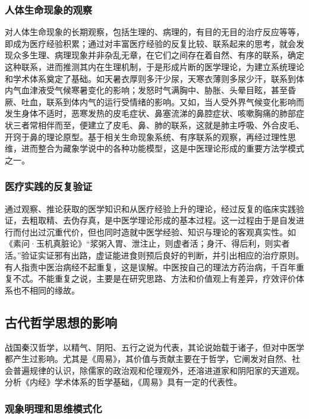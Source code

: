 \documentclass[draft,12pt]{ctexbook}
\begin{document}
\subsubsection{人体生命现象的观察}%

对人体生命现象的长期观察，包括生理的、病理的，有目的无目的治疗反应等等，即成为医疗经验积累；通过对丰富医疗经验的反复比较、联系起来的思考，就会发现众多生理、病理现象并非杂乱无章，在它们之间存在着自然、有序的联系，确定这种联系，进而推测其内在生理机制，于是形成片断的医学理论，为建立系统理论和学术体系奠定了基础。如天暑衣厚则多汗少尿，天寒衣薄则多尿少汗，联系到体内气血津液受气候寒暑变化的影响；发怒时气满胸中、胁胀、头晕目眩，甚至昏厥、吐血，联系到体内气的运行受情绪的影响。又如，当人受外界气候变化影响而发生身体不适时，恶寒发热的皮毛症状、鼻塞流涕的鼻腔症状、咳嗽胸痛的肺部症状三者常相伴而至，便建立了皮毛、鼻、肺的联系，这就是肺主呼吸、外合皮毛、开窍于鼻的理论原型。基于相关生命现象系统、有序联系的观察，再经过理性思维，进而整合为藏象学说中的各种功能模型，这是中医理论形成的重要方法学模式之一。

\subsubsection{医疗实践的反复验证}%

通过观察、推论获取的医学知识和从医疗经验上升的理论，经过反复的临床实践验证，去粗取精、去伪存真，是中医学理论形成的基本过程。这一过程由于是自发进行而付出过沉重代价，但也同时造就中医学经验、知识与理论的客观真实性。如《素问·玉机真脏论》“浆粥入胃、泄注止，则虚者活；身汗、得后利，则实者活。”验证实证邪有出路，虚证能进食则预后良好的判断，并引出相应的治疗原则。有人指责中医治病经不起重复，这是误解。中医按自己的理法方药治病，千百年重复不忒。不能重复之说，主要是在研究思路、方法和价值观上有差异，疗效评价体系也不相同的缘故。

\subsection{古代哲学思想的影响} %

战国秦汉哲学，以精气、阴阳、五行之说为代表，其论说始载于诸子，但对中医学都产生过影响。尤其是《周易》，其价值与贡献主要在于哲学，它阐发对自然、社会普遍规律的认识，除儒家的政治观和伦理观外，还溶进道家和阴阳家的天道观。分析《内经》学术体系的哲学基础，《周易》具有一定的代表性。

\subsubsection{观象明理和思维模式化}%
\end{document}
